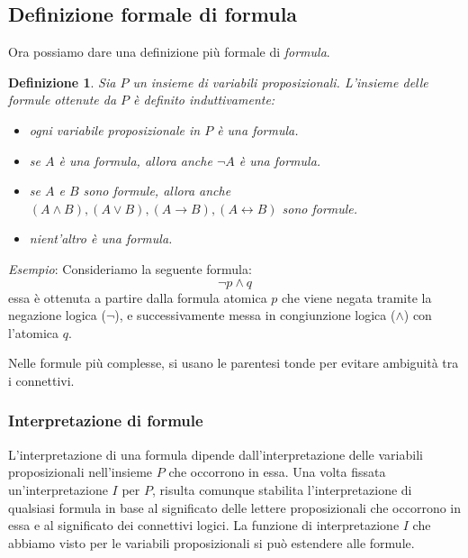 \documentclass[a4paper,12pt]{report}
\newcommand{\tto} {\leftrightarrow}
\newtheorem{definition}{Definizione}[section]
\begin{document}
\subsection*{Definizione formale di formula}
Ora possiamo dare una definizione più formale di \emph{formula}.
\begin{definition}
    Sia $P$ un insieme di variabili proposizionali. L'insieme delle formule ottenute da $P$ è definito induttivamente:
    \begin{itemize}
        \item ogni variabile proposizionale in $P$ è una formula.
        \item se $A$ è una formula, allora anche $\lnot A$ è una formula.
        \item se $A$ e $B$ sono formule, allora anche $(A \land B), (A \lor B), (A \to B), (A \tto B)$ sono formule.
        \item nient'altro è una formula.
    \end{itemize} 
\end{definition}
\emph{Esempio}: Consideriamo la seguente formula: 
\[ \lnot p \land q\] 
essa è ottenuta a partire dalla formula atomica $p$ che viene negata tramite la negazione logica ($\lnot$), e successivamente messa in congiunzione logica ($\land$) con l'atomica $q$. 

Nelle formule più complesse, si usano le parentesi tonde per evitare ambiguità tra i connettivi.

\subsubsection*{Interpretazione di formule}
L'interpretazione di una formula dipende dall'interpretazione delle variabili proposizionali nell'insieme $P$ che occorrono in essa. Una volta fissata un'interpretazione $I$ per $P$, risulta comunque stabilita l'interpretazione di qualsiasi formula in base al significato delle lettere proposizionali che occorrono in essa e al significato dei connettivi logici. La funzione di interpretazione $I$ che abbiamo visto per le variabili proposizionali si può estendere alle formule.
\end{document}
